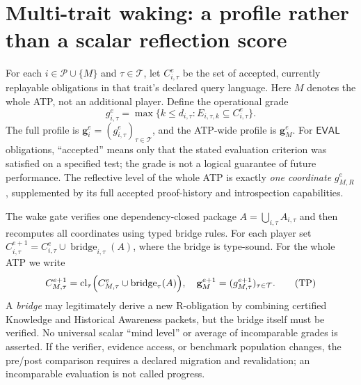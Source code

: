 \documentclass[11pt,letterpaper]{article}
\theoremstyle{definition}
\theoremstyle{plain}
\theoremstyle{definition}
\begin{document}
\section{Multi-trait waking: a profile rather than a scalar reflection score}\label{gl-first-W0-s8}
\label{sec:profiles}
For each $i\in\mathcal P\cup\{M\}$ and $\tau\in\mathcal T$, let $C_{i,\tau}^{e}$ be the set of accepted, currently replayable obligations in that trait's declared query language. Here $M$ denotes the whole ATP, not an additional player. Define the operational grade
\[
  g_{i,\tau}^{e}=\max\{k\le d_{i,\tau}: E_{i,\tau,k}\subseteq C_{i,\tau}^{e}\}.
\]
The full profile is $\mathbf g_i^e=(g_{i,\tau}^e)_{\tau\in\mathcal T}$, and the ATP-wide profile is $\mathbf g_M^e$. For $\mathsf{EVAL}$ obligations, ``accepted'' means only that the stated evaluation criterion was satisfied on a specified test; the grade is not a logical guarantee of future performance. The reflective level of the whole ATP is exactly \emph{one coordinate} $g_{M,R}^e$, supplemented by its full accepted proof-history and introspection capabilities.

The wake gate verifies one dependency-closed package $A=\bigcup_{i,\tau}A_{i,\tau}$ and then recomputes all coordinates using typed bridge rules. For each player set $C_{i,\tau}^{e+1}=C_{i,\tau}^{e}\cup\operatorname{bridge}_{i,\tau}(A)$, where the bridge is type-sound. For the whole ATP we write
\[
 C_{M,\tau}^{e+1}=\operatorname{cl}_{\tau}\Bigl(C_{M,\tau}^{e}\cup
 \operatorname{bridge}_{\tau}(A)\Bigr),\quad
\mathbf g_M^{e+1}=(g_{M,\tau}^{e+1})_{\tau\in\mathcal T}.
\tag{TP}
\]
A \emph{bridge} may legitimately derive a new R-obligation by combining certified Knowledge and Historical Awareness packets, but the bridge itself must be verified. No universal scalar ``mind level'' or average of incomparable grades is asserted. If the verifier, evidence access, or benchmark population changes, the pre/post comparison requires a declared migration and revalidation; an incomparable evaluation is not called progress.
\end{document}
